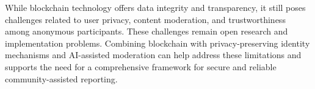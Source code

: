 While blockchain technology offers data integrity and transparency, it still poses challenges related to user privacy, content moderation, and trustworthiness among anonymous participants.  These challenges remain open research and implementation problems. Combining  blockchain with privacy-preserving identity mechanisms and \ac{AI}-assisted moderation can help address these limitations and supports the need for a comprehensive framework for secure and reliable community-assisted reporting.





